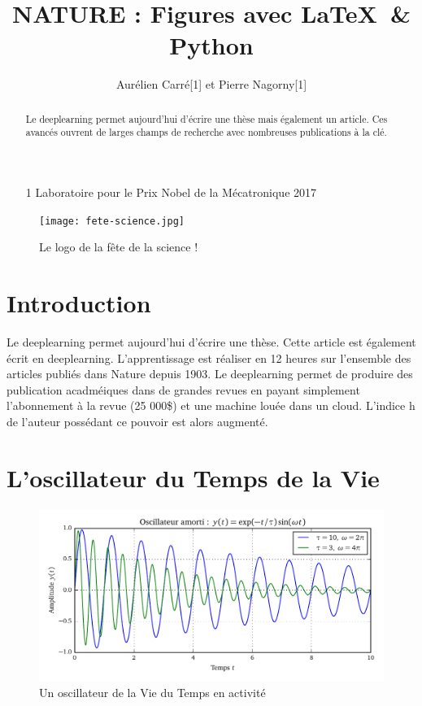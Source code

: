\documentclass[10pt,a4paper]{article}
\title{NATURE : Figures avec \LaTeX \ \& Python}
\author{Aurélien Carré[1] et Pierre Nagorny[1]}
\begin{document}
\maketitle

\begin{itemize}
\item [1]Laboratoire pour le Prix Nobel de la Mécatronique 2017
\end{itemize}

\begin{figure}[h]
\begin{center}
\texttt{[image: fete-science.jpg]}
\caption{Le logo de la fête de la science !}
\end{center}
\end{figure}

\begin{abstract}
    Le deeplearning permet aujourd'hui d'écrire une thèse mais également un article. Ces avancés ouvrent de larges champs de recherche avec nombreuses publications à la clé.
\end{abstract}

\section{Introduction}
Le deeplearning permet aujourd'hui d'écrire une thèse. Cette article est également écrit en deeplearning.
L'apprentissage est réaliser en 12 heures sur l'ensemble des articles publiés dans Nature depuis 1903.
Le deeplearning permet de produire des publication acadméiques dans de grandes revues en payant simplement l'abonnement à la revue (25 000\$) et une machine louée dans un cloud. L'indice h de l'auteur possédant ce pouvoir est alors augmenté.



\section{L'oscillateur du Temps de la Vie}
\begin{figure}[h]
\begin{center}
\includegraphics{Oscillateur}
\end{center}
\caption{Un oscillateur de la Vie du Temps en activité}
\end{figure}
\end{document}
